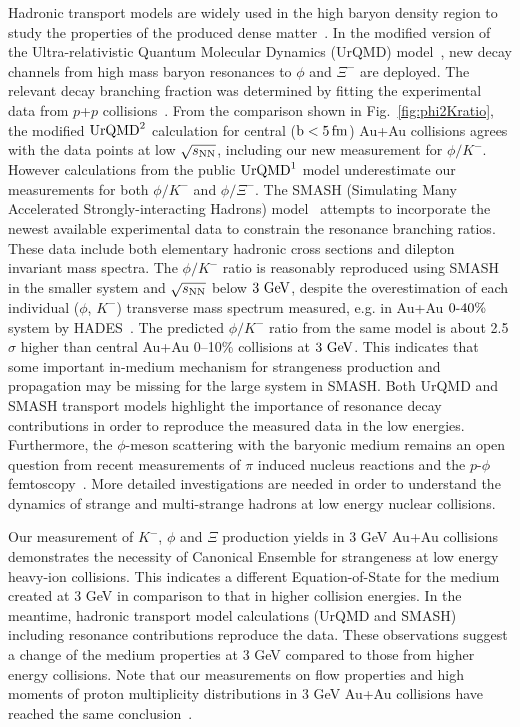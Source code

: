\documentclass[aps,tightenlines,superscriptaddress,twocolumn]{revtex4-1}
\begin{document}
Hadronic transport models are widely used in the high baryon density region to study the properties of the produced dense matter~\cite{UrQMD_2:1998,urQMD:1999,Hartnack:2011cn,Steinheimer_2015_UrQMD,Elfner_SMASH:2019,Song:2020clw}. In the modified version of the Ultra-relativistic Quantum Molecular Dynamics (UrQMD) model~\cite{Steinheimer_2015_UrQMD}, new decay channels from high mass baryon resonances to $\phi$ and $\Xi^-$ are deployed. The relevant decay branching fraction was determined by fitting the experimental data from $p$+$p$ collisions~\cite{ANKE_phi:2008}. From the comparison shown in Fig.~\ref{fig:phi2Kratio}, the modified $\textup{UrQMD}^{2}$ calculation for central ($\rm{b}<5\,\rm{fm}$) Au+Au collisions agrees with the data points at low ${\sqrt{s_{\rm NN}}}$, including our new measurement for $\phi/K^-$.
However calculations from the public $\textup{UrQMD}^{1}$ model underestimate our measurements for both $\phi/K^-$ and $\phi/\Xi^-$. The SMASH (Simulating Many Accelerated Strongly-interacting Hadrons) model~\cite{Elfner_SMASH:2019} attempts to incorporate the newest available experimental data to constrain the resonance branching ratios. These data include both elementary hadronic cross sections and dilepton invariant mass spectra. The $\phi/K^-$ ratio is reasonably reproduced using SMASH in the smaller system and ${\sqrt{s_{\rm NN}}}$ below $\textup{3 GeV}$, despite the overestimation of each individual ($\phi$, $K^-$) transverse mass spectrum measured, e.g. in Au+Au $\textup{0-40\%}$ system by HADES~\cite{HADES_phi_AuAu:2018,Elfner_SMASH:2019}. The predicted $\phi/K^-$ ratio from the same model is about 2.5$\sigma$ higher than central Au+Au 0--10\% collisions at $\textup{3 GeV}$. This indicates that some important in-medium mechanism for strangeness production and propagation may be missing for the large system in SMASH. Both UrQMD and SMASH transport models highlight the importance of resonance decay contributions in order to reproduce the measured data in the low energies. Furthermore, the $\phi$-meson scattering with the baryonic medium remains an open question from recent measurements of $\pi$ induced nucleus reactions and the $p$-$\phi$ femtoscopy~\cite{HADES_PRL_W_C:2019,ALICE_PRL_pp:2021}. More detailed investigations are needed in order to understand the dynamics of strange and multi-strange hadrons at low energy nuclear collisions.

Our measurement of $K^-$, $\phi$ and $\Xi$ production yields in 3 GeV Au+Au collisions demonstrates the necessity of Canonical Ensemble for strangeness at low energy heavy-ion collisions. This indicates a different Equation-of-State for the medium created at 3 GeV in comparison to that in higher collision energies. In the meantime,  hadronic transport model calculations (UrQMD and SMASH) including resonance contributions reproduce the data. These observations suggest a change of the medium properties at 3 GeV compared to those from higher energy collisions. Note that our measurements on flow properties and high moments of proton multiplicity distributions in 3 GeV Au+Au collisions have reached the same conclusion~\cite{STAR:2021fge,STAR:2021yiu}.
\end{document}
